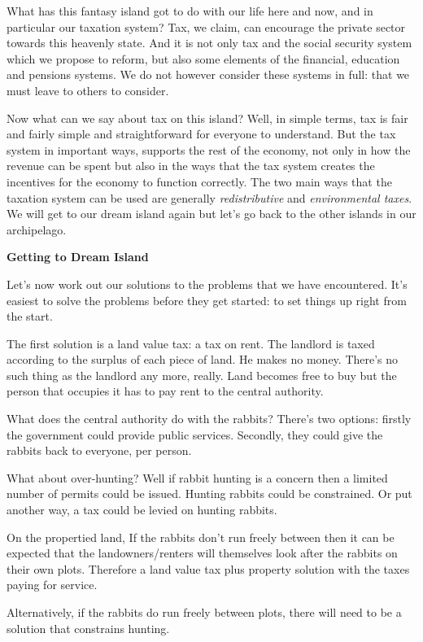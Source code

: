 \documentclass[]{tufte-handout}
\begin{document}
What has this fantasy island got to do with our life here and now, and
in particular our taxation system? Tax, we claim, can encourage the
private sector towards this heavenly state. And it is not only tax and
the social security system which we propose to reform, but also some
elements of the financial, education and pensions systems. We do not
however consider these systems in full: that we must leave to others to
consider.

Now what can we say about tax on this island? Well, in simple terms, tax
is fair and fairly simple and straightforward for everyone to
understand. But the tax system in important ways, supports the rest of
the economy, not only in how the revenue can be spent but also in the
ways that the tax system creates the incentives for the economy to
function correctly. The two main ways that the taxation system can be
used are generally \emph{redistributive} and \emph{environmental taxes}.
We will get to our dream island again but let's go back to the other
islands in our archipelago.

\textbf{Getting to Dream Island}

Let's now work out our solutions to the problems that we have
encountered. It's easiest to solve the problems before they get started:
to set things up right from the start.

The first solution is a land value tax: a tax on rent. The landlord is
taxed according to the surplus of each piece of land. He makes no money.
There's no such thing as the landlord any more, really. Land becomes
free to buy but the person that occupies it has to pay rent to the
central authority.

What does the central authority do with the rabbits? There's two
options: firstly the government could provide public services. Secondly,
they could give the rabbits back to everyone, per person.

What about over-hunting? Well if rabbit hunting is a concern then a
limited number of permits could be issued. Hunting rabbits could be
constrained. Or put another way, a tax could be levied on hunting
rabbits.

On the propertied land, If the rabbits don't run freely between then it
can be expected that the landowners/renters will themselves look after
the rabbits on their own plots. Therefore a land value tax plus property
solution with the taxes paying for service.

Alternatively, if the rabbits do run freely between plots, there will
need to be a solution that constrains hunting.
\end{document}
